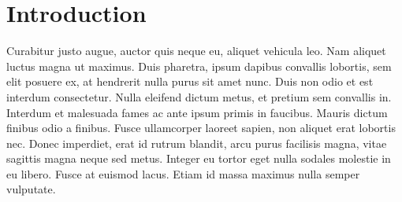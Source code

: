 
\section{Introduction}
 Curabitur justo augue, auctor quis neque eu, aliquet vehicula leo. Nam aliquet luctus magna ut maximus. Duis pharetra, ipsum dapibus convallis lobortis, sem elit posuere ex, at hendrerit nulla purus sit amet nunc. Duis non odio et est interdum consectetur. Nulla eleifend dictum metus, et pretium sem convallis in. Interdum et malesuada fames ac ante ipsum primis in faucibus. Mauris dictum finibus odio a finibus. Fusce ullamcorper laoreet sapien, non aliquet erat lobortis nec. Donec imperdiet, erat id rutrum blandit, arcu purus facilisis magna, vitae sagittis magna neque sed metus. Integer eu tortor eget nulla sodales molestie in eu libero. Fusce at euismod lacus. Etiam id massa maximus nulla semper vulputate\cite{greenwade93}.